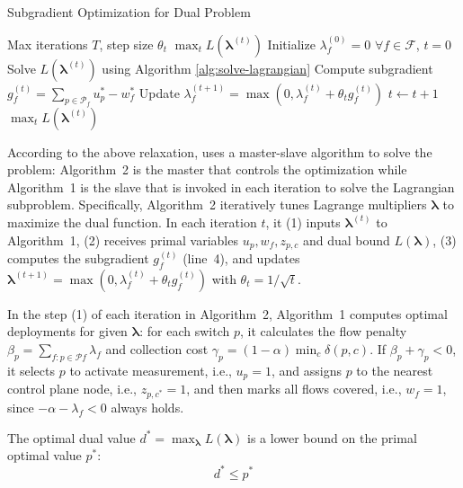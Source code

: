 \begin{algorithm}[t]
\caption{Subgradient Optimization for Dual Problem}
\label{alg:subgradient}
\begin{algorithmic}[1]
\footnotesize
\Require Max iterations \(T\), step size \(\theta_t\)
\Ensure \(\max_t L(\boldsymbol{\lambda}^{(t)})\)
\State Initialize \(\lambda_f^{(0)} = 0\) \(\forall f \in \mathcal{F}\), \(t = 0\)
  \State Solve \(L(\boldsymbol{\lambda}^{(t)})\) using Algorithm \ref{alg:solve-lagrangian}
  \State Compute subgradient \(g_f^{(t)} = \sum_{p \in \mathcal{P}_f} u_p^* - w_f^*\)
  \State Update \(\lambda_f^{(t+1)} = \max\left(0, \lambda_f^{(t)} + \theta_t g_f^{(t)}\right)\)
  \State \(t \leftarrow t + 1\)
\EndWhile
\State \Return \(\max_t L(\boldsymbol{\lambda}^{(t)})\)
\end{algorithmic}
\end{algorithm}

According to the above relaxation, \sysname uses a master-slave algorithm to solve the problem: Algorithm~2 is the master that controls the optimization while Algorithm~1 is the slave that is invoked in each iteration to solve the Lagrangian subproblem. Specifically, Algorithm~2 iteratively tunes Lagrange multipliers $\boldsymbol{\lambda}$ to maximize the dual function. In each iteration $t$, it (1) inputs $\boldsymbol{\lambda}^{(t)}$ to Algorithm~1, (2) receives primal variables $u_p, w_f, z_{p,c}$ and dual bound $L(\boldsymbol{\lambda})$, (3) computes the subgradient $g_f^{(t)}$ (line~4), and updates $\boldsymbol{\lambda}^{(t+1)} = \max(0, \lambda_f^{(t)} + \theta_t g_f^{(t)})$ with $\theta_t = 1/\sqrt{t}$. 

In the step (1) of each iteration in Algorithm~2, Algorithm~1 computes optimal deployments for given $\boldsymbol{\lambda}$: for each switch $p$, it calculates the flow penalty $\beta_p = \sum_{f: p \in \mathcal{P}f} \lambda_f$ and collection cost $\gamma_p = (1-\alpha) \min_c \delta(p,c)$. If $\beta_p + \gamma_p < 0$, it selects $p$ to activate measurement, i.e., $u_p=1$, and assigns $p$ to the nearest control plane node, i.e., $z_{p,c^*}=1$, and then marks all flows covered, i.e., $w_f=1$, since $-\alpha - \lambda_f < 0$ always holds.

\begin{theorem}
The optimal dual value \(d^* = \max_{\boldsymbol{\lambda}} L(\boldsymbol{\lambda})\) is a lower bound on the primal optimal value \(p^*\):
\[
d^* \leq p^*
\]
\end{theorem}

